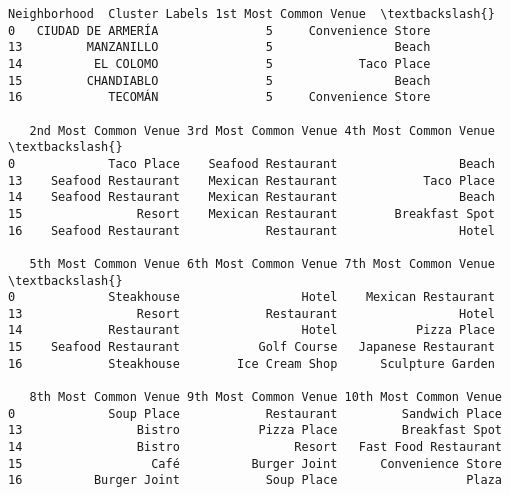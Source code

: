 \documentclass[11pt]{article}
\makeatletter
\newcommand{\boxspacing}{\kern\kvtcb@left@rule\kern\kvtcb@boxsep}
\newcommand{\prompt}[4]{
        \ttfamily\llap{{\color{#2}[#3]:\hspace{3pt}#4}}\vspace{-\baselineskip}
    }
\makeatother
\begin{document}
            \begin{tcolorbox}[breakable, size=fbox, boxrule=.5pt, pad at break*=1mm, opacityfill=0]
\prompt{Out}{outcolor}{52}{\boxspacing}
\begin{Verbatim}[commandchars=\\\{\}]
         Neighborhood  Cluster Labels 1st Most Common Venue  \textbackslash{}
0   CIUDAD DE ARMERÍA               5     Convenience Store
13         MANZANILLO               5                 Beach
14          EL COLOMO               5            Taco Place
15         CHANDIABLO               5                 Beach
16            TECOMÁN               5     Convenience Store

   2nd Most Common Venue 3rd Most Common Venue 4th Most Common Venue  \textbackslash{}
0             Taco Place    Seafood Restaurant                 Beach
13    Seafood Restaurant    Mexican Restaurant            Taco Place
14    Seafood Restaurant    Mexican Restaurant                 Beach
15                Resort    Mexican Restaurant        Breakfast Spot
16    Seafood Restaurant            Restaurant                 Hotel

   5th Most Common Venue 6th Most Common Venue 7th Most Common Venue  \textbackslash{}
0             Steakhouse                 Hotel    Mexican Restaurant
13                Resort            Restaurant                 Hotel
14            Restaurant                 Hotel           Pizza Place
15    Seafood Restaurant           Golf Course   Japanese Restaurant
16            Steakhouse        Ice Cream Shop      Sculpture Garden

   8th Most Common Venue 9th Most Common Venue 10th Most Common Venue
0             Soup Place            Restaurant         Sandwich Place
13                Bistro           Pizza Place         Breakfast Spot
14                Bistro                Resort   Fast Food Restaurant
15                  Café          Burger Joint      Convenience Store
16          Burger Joint            Soup Place                  Plaza
\end{Verbatim}
\end{tcolorbox}
        
\end{document}
